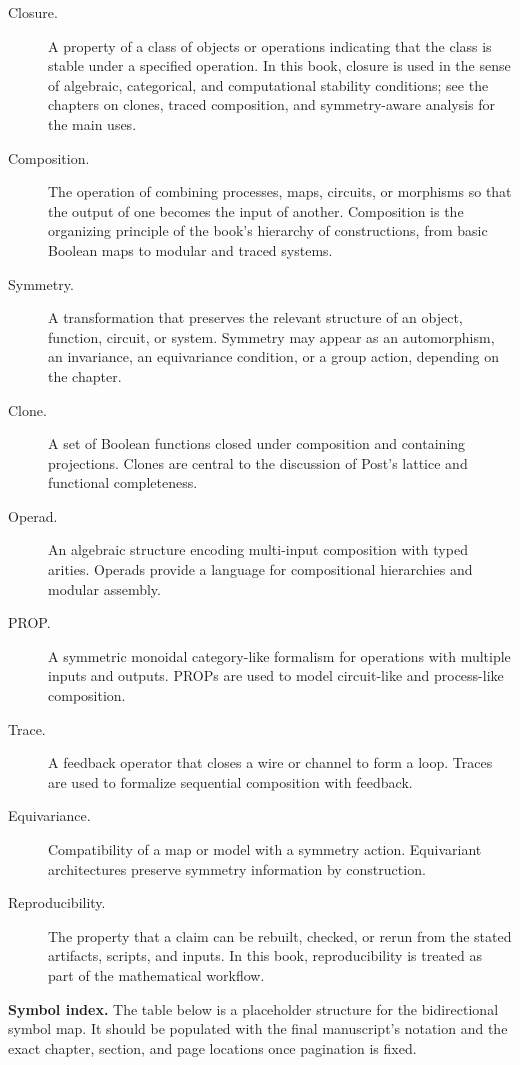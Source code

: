 \documentclass[11pt]{article}
\begin{document}
\begin{description}
  \item[Closure.] A property of a class of objects or operations indicating that the class is stable under a specified operation. In this book, closure is used in the sense of algebraic, categorical, and computational stability conditions; see the chapters on clones, traced composition, and symmetry-aware analysis for the main uses.
  \item[Composition.] The operation of combining processes, maps, circuits, or morphisms so that the output of one becomes the input of another. Composition is the organizing principle of the book's hierarchy of constructions, from basic Boolean maps to modular and traced systems.
  \item[Symmetry.] A transformation that preserves the relevant structure of an object, function, circuit, or system. Symmetry may appear as an automorphism, an invariance, an equivariance condition, or a group action, depending on the chapter.
  \item[Clone.] A set of Boolean functions closed under composition and containing projections. Clones are central to the discussion of Post's lattice and functional completeness.
  \item[Operad.] An algebraic structure encoding multi-input composition with typed arities. Operads provide a language for compositional hierarchies and modular assembly.
  \item[PROP.] A symmetric monoidal category-like formalism for operations with multiple inputs and outputs. PROPs are used to model circuit-like and process-like composition.
  \item[Trace.] A feedback operator that closes a wire or channel to form a loop. Traces are used to formalize sequential composition with feedback.
  \item[Equivariance.] Compatibility of a map or model with a symmetry action. Equivariant architectures preserve symmetry information by construction.
  \item[Reproducibility.] The property that a claim can be rebuilt, checked, or rerun from the stated artifacts, scripts, and inputs. In this book, reproducibility is treated as part of the mathematical workflow.
\end{description}

\medskip

\noindent\textbf{Symbol index.} The table below is a placeholder structure for the bidirectional symbol map. It should be populated with the final manuscript's notation and the exact chapter, section, and page locations once pagination is fixed.
\end{document}
